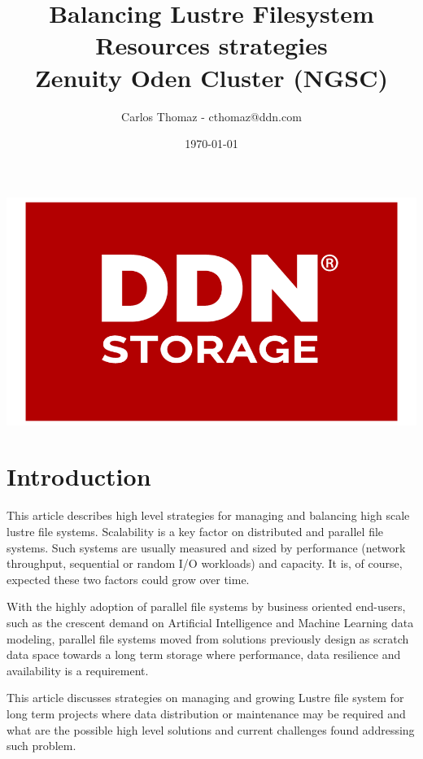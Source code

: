 \documentclass{article}
\title{%
Balancing Lustre Filesystem Resources strategies \\
\large Zenuity Oden Cluster (NGSC)}
\author{Carlos Thomaz - cthomaz@ddn.com}
\date{\today}
\begin{document}
\maketitle


\begin{center}
    \includegraphics[scale=0.14]{logo.png}\\[1cm] 
\end{center}

\newpage

\begin{versionhistory}

\end{versionhistory}


\newpage
\section{Introduction}
This article describes high level strategies for managing and balancing high scale lustre file systems. Scalability is a key factor on distributed and parallel file systems. Such systems are usually measured and sized by performance (network throughput, sequential or random I/O workloads) and capacity. It is, of course, expected these two factors could grow over time.

With the highly adoption of parallel file systems by business oriented end-users, such as the crescent demand on Artificial Intelligence and Machine Learning data modeling, parallel file systems moved from solutions previously design as scratch data space towards a long term storage where performance, data resilience and availability is a requirement.

This article discusses strategies on managing and growing Lustre file system for long term projects where data distribution or maintenance may be required and what are the possible high level solutions and current challenges found addressing such problem.
\end{document}
